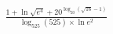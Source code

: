 \documentclass[preview]{standalone}
\begin{document}
\begin{align*}
\frac{1+\ln \sqrt{ e{^4} }+20^{\log_{20}(\sqrt{ 16 }-1)}}{\log_{525}(525)\times \ln e^{2}}
\end{align*}
\end{document}
